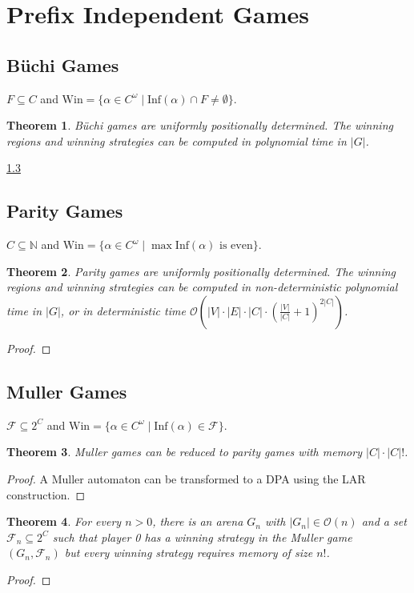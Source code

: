 \documentclass{article}
\newtheorem{theorem}{Theorem}
\begin{document}
\section{Prefix Independent Games}
\subsection{Büchi Games}
$F \subseteq C$ and $\text{Win} = \{ \alpha \in C^\omega \mid \text{Inf}(\alpha) \cap F \neq \emptyset \}$.

\begin{theorem}
	Büchi games are uniformly positionally determined. The winning regions and winning strategies can be computed in polynomial time in $|G|$.
\end{theorem}
\ref{} %

\subsection{Parity Games}
$C \subseteq \mathbb{N}$ and $\text{Win} = \{ \alpha \in C^\omega \mid \max \text{Inf}(\alpha) \text{ is even}\}$.

\begin{theorem}
	Parity games are uniformly positionally determined. The winning regions and winning strategies can be computed in non-deterministic polynomial time in $|G|$, or in deterministic time $\mathcal{O}\left(|V| \cdot |E| \cdot |C| \cdot (\frac{|V|}{|C|} + 1)^{2|C|}\right)$.
\end{theorem}
\begin{proof}
\end{proof}

\subsection{Muller Games}
$\mathcal{F} \subseteq 2^C$ and $\text{Win} = \{ \alpha \in C^\omega \mid \text{Inf}(\alpha) \in \mathcal{F} \}$.

\begin{theorem}
	Muller games can be reduced to parity games with memory $|C| \cdot |C|!$.
\end{theorem}
\begin{proof}
	A Muller automaton can be transformed to a DPA using the LAR construction.
\end{proof}

\begin{theorem}
	For every $n > 0$, there is an arena $G_n$ with $|G_n| \in \mathcal{O}(n)$ and a set $\mathcal{F}_n \subseteq 2^C$ such that player 0 has a winning strategy in the Muller game $(G_n, \mathcal{F}_n)$ but every winning strategy requires memory of size $n!$.
\end{theorem}
\begin{proof}
\end{proof}
\end{document}
